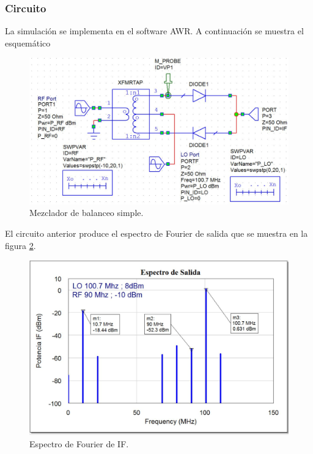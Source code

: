 \documentclass[twocolumn]{article}
\begin{document}
\subsubsection{Circuito}
La simulación se implementa en el software AWR. A continuación se muestra el esquemático
\begin{figure}[h]
  \centering    
	\includegraphics[width=\columnwidth]{imagenes/circuito2.jpg}
	\caption{Mezclador de balanceo simple.}\label{fig:circuito2}
\end{figure}

El circuito anterior produce el espectro de Fourier de salida que se muestra en la figura \textcolor{blue}{\ref{fig:IF2}}.
\begin{figure}[h]
  \centering    
	\includegraphics[width=\columnwidth]{imagenes/IF2.jpg}
	\caption{Espectro de Fourier de IF.}\label{fig:IF2}
\end{figure}
%
\end{document}
